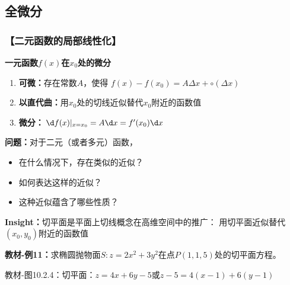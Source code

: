 \subsection{全微分}

\subsubsection{【二元函数的局部线性化】}

\begin{shaded}
	{\bf 一元函数$f(x)$在$x_0$处的微分}
	
	\begin{enumerate}[(1)]
  	  \setlength{\itemindent}{1cm}
	  \item {\bf 可微：}存在常数$A$，使得
	  $f(x)-f(x_0)=A\Delta x+\circ(\Delta x)$
	  \item {\bf 以直代曲：}用$x_0$处的切线近似替代$x_0$附近的函数值 
	  \item {\bf 微分：}$\d f(x)|_{x=x_0}=A\d x=f'(x_0)\d x$
	\end{enumerate}
\end{shaded}

{\bf 问题：}对于二元（或者多元）函数， 
\begin{itemize}
  \item 在什么情况下，存在类似的近似？
  \item 如何表达这样的近似？ 
  \item 这种近似蕴含了哪些性质？
\end{itemize}

{\bf Insight：}切平面是平面上切线概念在高维空间中的推广：
用切平面近似替代$(x_0,y_0)$附近的函数值

{\bf 教材-例11：}求椭圆抛物面$S:z=2x^2+3y^2$在点$P(1,1,5)$处的切平面方程。

\begin{center}
	
	教材-图10.2.4：切平面：$z=4x+6y-5$或$z-5=4(x-1)+6(y-1)$
\end{center}

